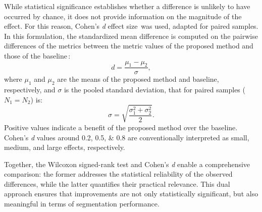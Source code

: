 While statistical significance establishes whether a difference is unlikely to have occurred by chance, it does not provide information on the magnitude of the effect. For this reason, Cohen's \textit{d} effect size\,\cite{Cohen2013} was used, adapted for paired samples. In this formulation, the standardized mean difference is computed on the pairwise differences of the metrics between the metric values of the proposed method and those of the baseline\,\cite{effect_size}:
\begin{equation}
    d = \frac{\mu_1-\mu_2}{\sigma},
\end{equation}
where $\mu_1$ and $\mu_2$ are the means of the proposed method and baseline, respectively, and $\sigma$ is the pooled standard deviation, that for paired samples ($N_1 = N_2$) is:
\begin{equation}
    \sigma = \sqrt{\frac{\sigma_1^2+\sigma_2^2}{2}}.
\end{equation}
Positive values indicate a benefit of the proposed method over the baseline. Cohen's \textit{d} values around \numlist{0.2; 0.5; 0.8} are conventionally interpreted as small, medium, and large effects, respectively.

Together, the Wilcoxon signed-rank test and Cohen's \textit{d} enable a comprehensive comparison: the former addresses the statistical reliability of the observed differences, while the latter quantifies their practical relevance. This dual approach ensures that improvements are not only statistically significant, but also meaningful in terms of segmentation performance.
